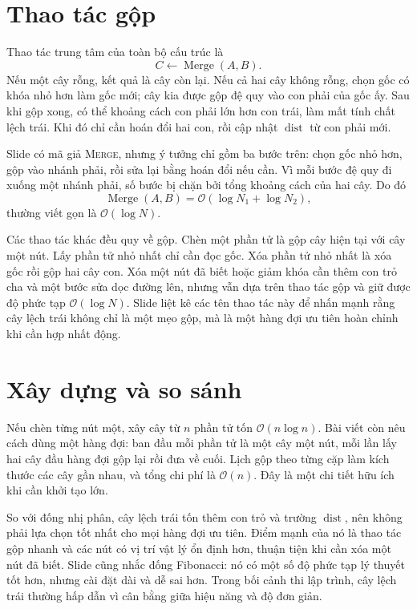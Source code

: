 \documentclass[11pt]{article}
\newcommand{\Oh}{\mathcal{O}}
\begin{document}
\section{Thao tác gộp}

Thao tác trung tâm của toàn bộ cấu trúc là
\[
  C\gets\operatorname{Merge}(A,B).
\]
Nếu một cây rỗng, kết quả là cây còn lại. Nếu cả hai cây không rỗng, chọn gốc
có khóa nhỏ hơn làm gốc mới; cây kia được gộp đệ quy vào con phải của gốc ấy.
Sau khi gộp xong, có thể khoảng cách con phải lớn hơn con trái, làm mất tính
chất lệch trái. Khi đó chỉ cần hoán đổi hai con, rồi cập nhật
\(\operatorname{dist}\) từ con phải mới.

Slide có mã giả \textsc{Merge}, nhưng ý tưởng chỉ gồm ba bước trên: chọn gốc
nhỏ hơn, gộp vào nhánh phải, rồi sửa lại bằng hoán đổi nếu cần. Vì mỗi bước
đệ quy đi xuống một nhánh phải, số bước bị chặn bởi tổng khoảng cách của hai
cây. Do đó
\[
  \operatorname{Merge}(A,B)=\Oh(\log N_1+\log N_2),
\]
thường viết gọn là \(\Oh(\log N)\).

Các thao tác khác đều quy về gộp. Chèn một phần tử là gộp cây hiện tại với
cây một nút. Lấy phần tử nhỏ nhất chỉ cần đọc gốc. Xóa phần tử nhỏ nhất là
xóa gốc rồi gộp hai cây con. Xóa một nút đã biết hoặc giảm khóa cần thêm con
trỏ cha và một bước sửa dọc đường lên, nhưng vẫn dựa trên thao tác gộp và giữ
được độ phức tạp \(\Oh(\log N)\). Slide liệt kê các tên thao tác này để nhấn
mạnh rằng cây lệch trái không chỉ là một mẹo gộp, mà là một hàng đợi ưu tiên
hoàn chỉnh khi cần hợp nhất động.

\section{Xây dựng và so sánh}

Nếu chèn từng nút một, xây cây từ \(n\) phần tử tốn \(\Oh(n\log n)\). Bài
viết còn nêu cách dùng một hàng đợi: ban đầu mỗi phần tử là một cây một nút,
mỗi lần lấy hai cây đầu hàng đợi gộp lại rồi đưa về cuối. Lịch gộp theo từng
cặp làm kích thước các cây gần nhau, và tổng chi phí là \(\Oh(n)\). Đây là
một chi tiết hữu ích khi cần khởi tạo lớn.

So với đống nhị phân, cây lệch trái tốn thêm con trỏ và trường
\(\operatorname{dist}\), nên không phải lựa chọn tốt nhất cho mọi hàng đợi ưu
tiên. Điểm mạnh của nó là thao tác gộp nhanh và các nút có vị trí vật lý ổn
định hơn, thuận tiện khi cần xóa một nút đã biết. Slide cũng nhắc đống
Fibonacci: nó có một số độ phức tạp lý thuyết tốt hơn, nhưng cài đặt dài và
dễ sai hơn. Trong bối cảnh thi lập trình, cây lệch trái thường hấp dẫn vì cân
bằng giữa hiệu năng và độ đơn giản.
\end{document}
